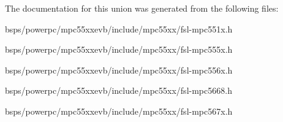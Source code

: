 \begin{DoxyCompactItemize}
\begin{tabbing}
\end{tabbing}\end{DoxyCompactItemize}


The documentation for this union was generated from the following files\+:\begin{DoxyCompactItemize}
\item 
bsps/powerpc/mpc55xxevb/include/mpc55xx/fsl-\/mpc551x.\+h\item 
bsps/powerpc/mpc55xxevb/include/mpc55xx/fsl-\/mpc555x.\+h\item 
bsps/powerpc/mpc55xxevb/include/mpc55xx/fsl-\/mpc556x.\+h\item 
bsps/powerpc/mpc55xxevb/include/mpc55xx/fsl-\/mpc5668.\+h\item 
bsps/powerpc/mpc55xxevb/include/mpc55xx/fsl-\/mpc567x.\+h\end{DoxyCompactItemize}
